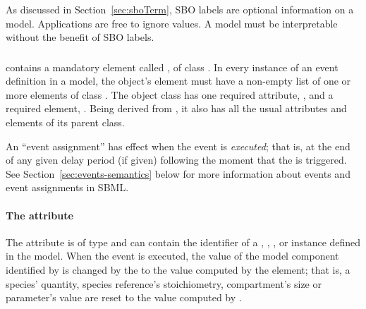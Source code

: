 As discussed in Section~\ref{sec:sboTerm}, SBO labels are optional
information on a model.  Applications are free to ignore
 values.  A model must be interpretable without the
benefit of SBO labels.



\subsubsection{}
\label{sec:eventassignment}
\label{sec:listofeventassignments}

\Event contains a mandatory element called
, of class \ListOfEventAssignments.
In every instance of an event definition in a model, the object's
 element must have a non-empty list
of one or more  elements of class
\EventAssignment.  The object class \EventAssignment has one
required attribute, , and a required element,
.  Being derived from \SBase, it also has all the
usual attributes and elements of its parent class.

An ``event assignment'' has effect when the event is
\emph{executed}; that is, at the end of any given delay period (if
given) following the moment that the \Event is triggered.  See
Section~\ref{sec:events-semantics} below for more information
about events and event assignments in SBML.


\paragraph{The  attribute}

The  attribute is of type  and can
contain the identifier of a \Compartment, \Species, \SpeciesReference,
or \Parameter instance defined in the model.  
When the event is executed, the value of
the model component identified by  is changed by
the \EventAssignment to the value computed by the 
element; that is, a species' quantity, species reference's stoichiometry, 
compartment's size or parameter's value are reset to the value 
computed by .

